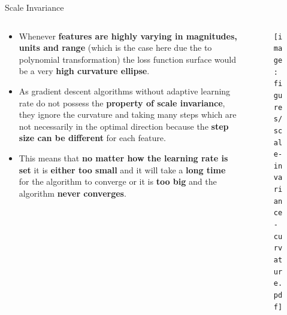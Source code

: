 \documentclass[document.tex]{subfiles}
\begin{document}
    \begin{frame}{Scale Invariance}
        \begin{columns}
            \begin{column}{0.6\textwidth}
                \begin{itemize}
                    \item Whenever \textbf{features are highly varying in magnitudes, units and range} (which is the case here due the to polynomial transformation) the loss function surface would be a very \textbf{high curvature ellipse}.
                    \item As gradient descent algorithms without adaptive learning rate do not possess the \textbf{property of scale invariance}, they ignore the curvature and taking many steps which are not necessarily in the optimal direction because the \textbf{step size can be different} for each feature.
                    \item This means that \textbf{no matter how the learning rate is set} it is \textbf{either too small} and it will take a \textbf{long time} for the algorithm to converge or it is \textbf{too big} and the algorithm \textbf{never converges}.
                \end{itemize}
            \end{column}
            \begin{column}{0.4\textwidth}
                \begin{figure}
                    \label{fig:scale-invariance-curvature}
                    \texttt{[image: figures/scale-invariance-curvature.pdf]}
                \end{figure}
            \end{column}
        \end{columns}
    \end{frame}
    
\end{document}
